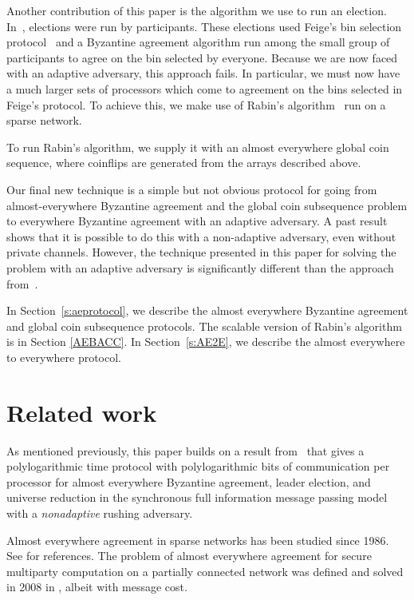 \documentclass[letterpaper,11pt]{article}
\newcommand{\old}[1]{}
\begin{document}
Another contribution of this paper is the algorithm we use to run an election.  In~\cite{KSSV}, elections were run by participants.  These elections used Feige's bin selection protocol~\cite{Feige} and a Byzantine agreement algorithm run among the small group of participants to agree on the bin selected by everyone.  Because we are now faced with an adaptive adversary, this approach fails.  In particular, we must now have a much larger sets of processors which come to agreement on the bins selected in Feige's protocol.  To achieve this, we make use of Rabin's algorithm~\cite{rabin1983randomized} run on a sparse network.  
\old{To ensure that Rabin's algorithm is bandwidth efficient, not only do we run it on a sparse network, but we also}
To run Rabin's algorithm, we supply it with an almost everywhere global coin sequence, where coinflips are generated from the arrays described above.  

Our final new technique is a simple but not obvious protocol for going from almost-everywhere Byzantine agreement and the global coin subsequence problem to everywhere Byzantine agreement with an adaptive adversary.  A past result~\cite{KSDISC09} shows that it is possible to do this with a non-adaptive adversary, even without private channels.  However, the technique presented in this paper for solving the problem with an adaptive adversary is significantly different than the approach from~\cite{KSDISC09}.

 \medskip
 
In Section~\ref{s:aeprotocol}, we describe the almost everywhere Byzantine agreement  and global coin subsequence protocols. The scalable version of Rabin's algorithm is in Section \ref{AEBACC}.  In Section~\ref{s:AE2E}, we describe the almost everywhere to everywhere protocol. 

\section{Related work}

As mentioned previously, this paper builds on a result from~\cite{KSSV} that gives a polylogarithmic time protocol with polylogarithmic bits of communication per processor for almost everywhere Byzantine agreement, leader election, and universe reduction in the synchronous full information message passing model with a \emph{nonadaptive} rushing adversary. 
 
Almost everywhere agreement in sparse networks has been studied since 1986. See \cite{KSSV,KSSV2} for references. The problem of almost everywhere agreement for secure multiparty computation on a partially connected network was defined and solved in 2008 in \cite{GO}, albeit with  message cost.
\end{document}
